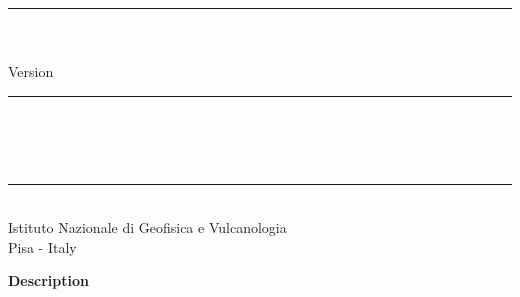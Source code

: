 
\thispagestyle{empty}

\vspace*{0.3in}

\begin{centering}
  \rule{6in}{0.04in}				\\	\vspace{0.25in}
  {\Huge \PDAC\ \UGTITLE}			\\	\vspace{0.25in}
  {\Large Version \PDACVERSION}			\\	\vspace{0.20in}
  \rule{6in}{0.04in}				\\	\vspace{0.25in}
  {\Large \PDACAUTHORS}				\\	\vspace{0.20in}
  \PDACDATE					\\	\vspace{0.20in}
  \rule{6in}{0.04in}				\\	\vspace{0.25in}
  {\large       Istituto Nazionale di Geofisica e Vulcanologia} \\ 
  {\large       Pisa - Italy}      \\ 
\end{centering}
\vspace{0.2in}

\begin{center}
  {\Large \bf Description}
\end{center}

\noindent \UGDESC

